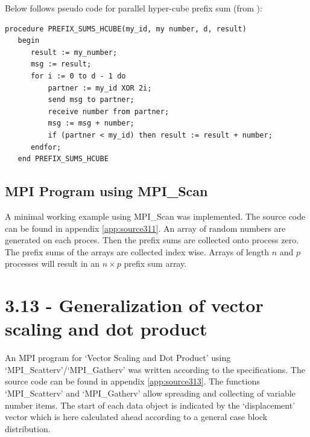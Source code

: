 \documentclass[a4paper,11pt,twoside]{article}
\begin{document}
Below follows pseudo code for parallel hyper-cube prefix sum (from \cite{grama2003}):

\begin{verbatim}
procedure PREFIX_SUMS_HCUBE(my_id, my number, d, result) 
   begin 
      result := my_number; 
      msg := result; 
      for i := 0 to d - 1 do 
          partner := my_id XOR 2i; 
          send msg to partner; 
          receive number from partner; 
          msg := msg + number; 
          if (partner < my_id) then result := result + number; 
      endfor; 
   end PREFIX_SUMS_HCUBE
\end{verbatim}



\subsection*{MPI Program using MPI\_Scan}
A minimal working example using MPI\_Scan was implemented. The source code can be found in appendix \ref{app:source311}. An array of random numbers are generated on each proces. Then the prefix sums are collected onto process zero. The prefix sums of the arrays are collected index wise. Arrays of length $n$ and $p$ processes will result in an $n \times p$ prefix sum array.  


\section{3.13 - Generalization of vector scaling and dot product}
An MPI program for `Vector Scaling and Dot Product' using `MPI\_Scatterv'/`MPI\_Gatherv' was written according to the specifications. The source code can be found in appendix \ref{app:source313}. The functions `MPI\_Scatterv' and `MPI\_Gatherv' allow spreading and collecting of variable number items. The start of each data object is indicated by the `displacement' vector which is here calculated ahead according to a general case block distribution.
\end{document}
